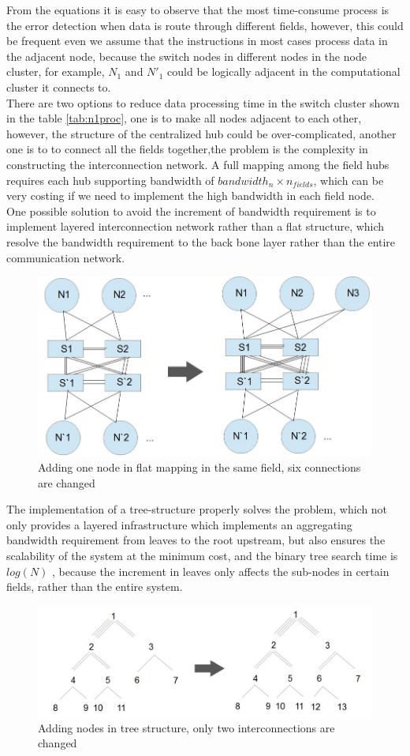 \documentclass[11pt,openright,a4paper]{report}
\begin{document}
From the equations it is easy to observe that the most time-consume process is the error detection when data is route through different fields, however, this could be frequent even we assume that the instructions in most cases process data in the adjacent node, because the switch nodes in different nodes in the node cluster, for example, $N_{1}$ and ${N}'_{1}$ could be logically adjacent in the computational cluster it connects to.\\
There are two options to reduce data processing time in the switch cluster shown in the table \ref{tab:n1proc}, one is to make all nodes adjacent to each other, however, the structure of the centralized hub could be over-complicated, another one is to to connect all the fields together,the problem is the complexity in constructing the interconnection network. A full mapping among the field hubs requires each hub supporting bandwidth of $bandwidth_{n}\times n_{fields}$, which can be very costing if we need to implement the high bandwidth in each field node.\\
One possible solution to avoid the increment of bandwidth requirement is to implement layered interconnection network rather than a flat structure, which resolve the bandwidth requirement to the back bone layer rather than the entire communication network. \\
\begin{figure}[H]
	\centering
    \includegraphics[width=0.6\linewidth]{picture/flat_addNode.JPG}
    \caption{Adding one node in flat mapping in the same field, six connections are changed}
    \label{fig:flatadd}
\end{figure}
The implementation of a tree-structure properly solves the problem, which not only provides a layered infrastructure which implements an aggregating bandwidth requirement from leaves to the root upstream, but also ensures the scalability of the system at the minimum cost, and the binary tree search time is $log(N)$ \cite{ellis1980concurrent}, because the increment in leaves only affects the sub-nodes in certain fields, rather than the entire system.\\
\begin{figure}[H]
	\centering
    \includegraphics[width=0.6\linewidth]{picture/tree_addNodes.jpg}
    \caption{Adding nodes in tree structure, only two interconnections are changed}
    \label{fig:addnode}
\end{figure}
\end{document}
